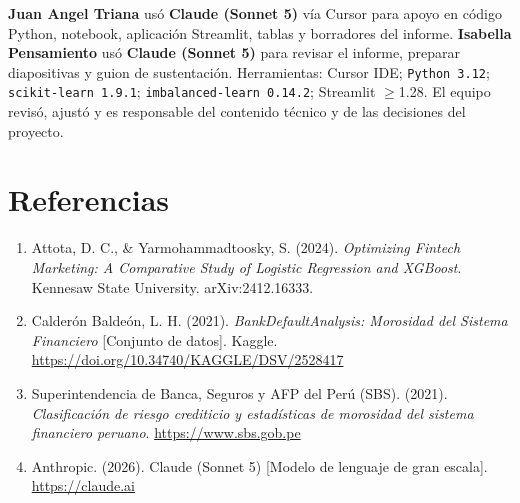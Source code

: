 \documentclass[11pt]{article}
\begin{document}
\textbf{Juan Angel Triana} usó \textbf{Claude (Sonnet 5)} vía Cursor para apoyo en código Python, notebook, aplicación Streamlit, tablas y borradores del informe. \textbf{Isabella Pensamiento} usó \textbf{Claude (Sonnet 5)} para revisar el informe, preparar diapositivas y guion de sustentación. Herramientas: Cursor IDE; \texttt{Python 3.12}; \texttt{scikit-learn 1.9.1}; \texttt{imbalanced-learn 0.14.2}; Streamlit $\geq$1.28. El equipo revisó, ajustó y es responsable del contenido técnico y de las decisiones del proyecto.

\section*{Referencias}

\begin{enumerate}[leftmargin=1.6em]
\item Attota, D. C., \& Yarmohammadtoosky, S. (2024). \textit{Optimizing Fintech Marketing: A Comparative Study of Logistic Regression and XGBoost}. Kennesaw State University. arXiv:2412.16333.
\item Calderón Baldeón, L. H. (2021). \textit{BankDefaultAnalysis: Morosidad del Sistema Financiero} [Conjunto de datos]. Kaggle. \url{https://doi.org/10.34740/KAGGLE/DSV/2528417}
\item Superintendencia de Banca, Seguros y AFP del Perú (SBS). (2021). \textit{Clasificación de riesgo crediticio y estadísticas de morosidad del sistema financiero peruano}. \url{https://www.sbs.gob.pe}
\item Anthropic. (2026). Claude (Sonnet 5) [Modelo de lenguaje de gran escala]. \url{https://claude.ai}
\end{enumerate}
\end{document}
